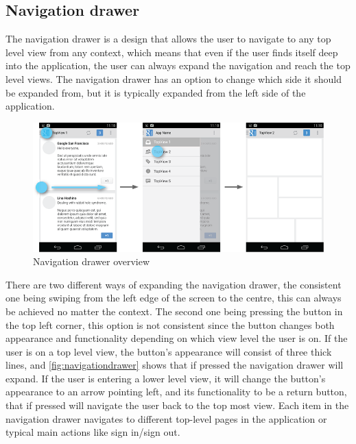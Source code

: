\subsection{Navigation drawer}
The navigation drawer is a design that allows the user to navigate to any top level view from any context, which means that even if the user finds itself deep into the application, the user can always expand the navigation and reach the top level views. 
The navigation drawer has an option to change which side it should be expanded from, but it is typically expanded from the left side of the application.
\begin{figure}[H]
\centering
\includegraphics[width=0.9\linewidth]{img/screenshots/navigation_drawer_overview.png}
\caption{Navigation drawer overview \cite{guidelines-navigationdrawer}}
\label{fig:navigationdrawer}
\end{figure}
There are two different ways of expanding the navigation drawer, the consistent one being swiping from the left edge of the screen to the centre, this can always be achieved no matter the context. 
The second one being pressing the button in the top left corner, this option is not consistent since the button changes both appearance and functionality depending on which view level the user is on. 
If the user is on a top level view, the button's appearance will consist of three thick lines, and \autoref{fig:navigationdrawer} shows that if pressed the navigation drawer will expand.
If the user is entering a lower level view, it will change the button's appearance to an arrow pointing left, and its functionality to be a return button, that if pressed will navigate the user back to the top most view. 
Each item in the navigation drawer navigates to different top-level pages in the application or typical main actions like sign in/sign out.

